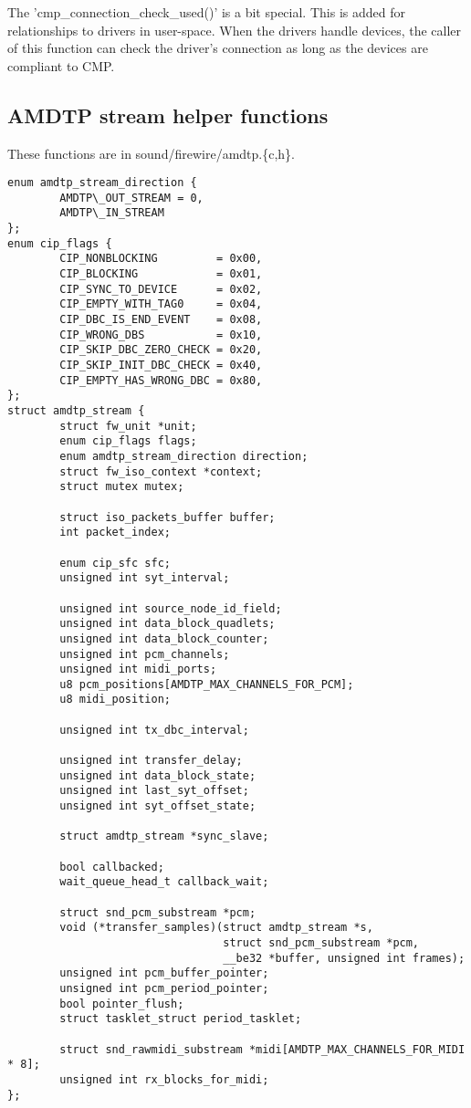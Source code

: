 \documentclass[onecolumn]{article}
\begin{document}
The 'cmp\_connection\_check\_used()' is a bit special. This is added for relationships to drivers in user-space. When the drivers handle devices, the caller of this function can check the driver's connection as long as the devices are compliant to CMP.

\subsection{AMDTP stream helper functions}

These functions are in sound/firewire/amdtp.\{c,h\}.

\begin{verbatim}
enum amdtp_stream_direction {
        AMDTP\_OUT_STREAM = 0,
        AMDTP\_IN_STREAM
};
enum cip_flags {
        CIP_NONBLOCKING         = 0x00,
        CIP_BLOCKING            = 0x01,
        CIP_SYNC_TO_DEVICE      = 0x02,
        CIP_EMPTY_WITH_TAG0     = 0x04,
        CIP_DBC_IS_END_EVENT    = 0x08,
        CIP_WRONG_DBS           = 0x10,
        CIP_SKIP_DBC_ZERO_CHECK = 0x20,
        CIP_SKIP_INIT_DBC_CHECK = 0x40,
        CIP_EMPTY_HAS_WRONG_DBC = 0x80,
};
struct amdtp_stream {
        struct fw_unit *unit;
        enum cip_flags flags;
        enum amdtp_stream_direction direction;
        struct fw_iso_context *context;
        struct mutex mutex;

        struct iso_packets_buffer buffer;
        int packet_index;

        enum cip_sfc sfc;
        unsigned int syt_interval;

        unsigned int source_node_id_field;
        unsigned int data_block_quadlets;
        unsigned int data_block_counter;
        unsigned int pcm_channels;
        unsigned int midi_ports;
        u8 pcm_positions[AMDTP_MAX_CHANNELS_FOR_PCM];
        u8 midi_position;

        unsigned int tx_dbc_interval;

        unsigned int transfer_delay;
        unsigned int data_block_state;
        unsigned int last_syt_offset;
        unsigned int syt_offset_state;

        struct amdtp_stream *sync_slave;

        bool callbacked;
        wait_queue_head_t callback_wait;

        struct snd_pcm_substream *pcm;
        void (*transfer_samples)(struct amdtp_stream *s,
                                 struct snd_pcm_substream *pcm,
                                 __be32 *buffer, unsigned int frames);
        unsigned int pcm_buffer_pointer;
        unsigned int pcm_period_pointer;
        bool pointer_flush;
        struct tasklet_struct period_tasklet;

        struct snd_rawmidi_substream *midi[AMDTP_MAX_CHANNELS_FOR_MIDI * 8];
        unsigned int rx_blocks_for_midi;
};
\end{verbatim}
\end{document}
